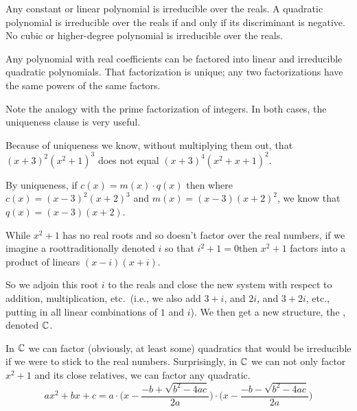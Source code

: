 \begin{theorem}
Any constant or linear polynomial is irreducible over the reals.
A quadratic polynomial is irreducible over the reals if and only if its
discriminant is negative.
No cubic or higher-degree polynomial is irreducible over the reals.
\end{theorem}

\begin{corollary}
Any polynomial with real coefficients can be factored into linear and
irreducible quadratic polynomials.
That factorization is unique; any two factorizations have the same powers of
the same factors.
\end{corollary}

Note the analogy with the prime factorization of integers.
In both cases, the uniqueness clause is very useful.

\begin{example}
Because of uniqueness we know, without multiplying them out, that
\( (x+3)^2(x^2+1)^3 \) does not equal
\( (x+3)^4(x^2+x+1)^2 \).
\end{example}

\begin{example}
By uniqueness, if \( c(x)=m(x)\cdot q(x) \) then where
\( c(x)=(x-3)^2(x+2)^3 \) and \( m(x)=(x-3)(x+2)^2 \),
we know that \( q(x)=(x-3)(x+2) \).
\end{example}

While \( x^2+1 \) has no real roots and so doesn't factor over the real
numbers, if we imagine a root\Dash traditionally denoted \( i \) 
so that \( i^2+1=0 \)\Dash then \( x^2+1 \) factors into a product of linears 
\( (x-i)(x+i) \).

So we adjoin this root \( i \) to the reals and close the new system with
respect to addition, multiplication, etc.\ (i.e., we also add
\( 3+i \), and \( 2i \), and \( 3+2i \), etc., putting in all linear
combinations of $1$ and $i$).
We then get a new structure, the , denoted
\( \mathbb{C} \).

In $\mathbb{C}$ we can factor (obviously, at least some) quadratics that would be
irreducible if we were to stick to the real numbers.
Surprisingly, in \( \mathbb{C} \) we can not only factor \( x^2+1 \)
and its close relatives, we can factor any quadratic.
\begin{equation*}
   ax^2+bx+c=
   a\cdot \big(x-\frac{-b+\sqrt{b^2-4ac}}{2a}\big)
    \cdot \big(x-\frac{-b-\sqrt{b^2-4ac}}{2a}\big)
\end{equation*}

